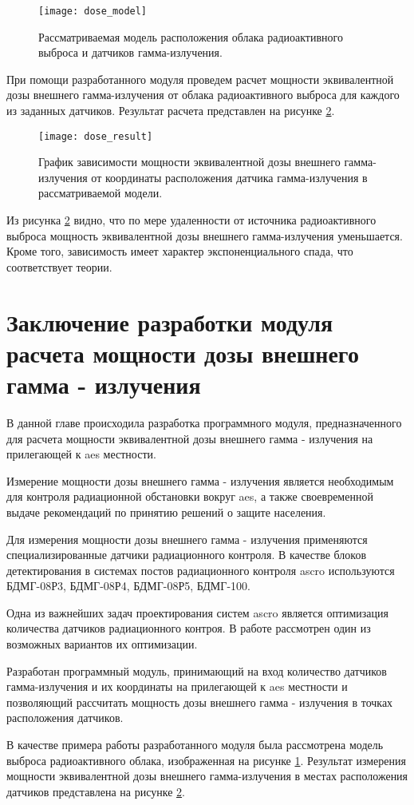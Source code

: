 \begin{figure}[ht]
    \centering
    \texttt{[image: dose\_model]}
    \captionsetup{justification=centering}
    \caption{Рассматриваемая модель расположения облака радиоактивного выброса и датчиков гамма-излучения.}
    \label{fig_dose_model}
\end{figure}

При помощи разработанного модуля проведем расчет мощности эквивалентной дозы внешнего гамма-излучения от облака 
радиоактивного выброса для каждого из заданных датчиков. Результат расчета представлен на рисунке \ref{fig_dose_result}.

\begin{figure}[ht]
    \centering
    \texttt{[image: dose\_result]}
    \captionsetup{justification=centering}
    \caption{График зависимости мощности эквивалентной дозы внешнего гамма-излучения от координаты расположения датчика 
        гамма-излучения в рассматриваемой модели.}
    \label{fig_dose_result}
\end{figure}

Из рисунка \ref{fig_dose_result} видно, что по мере удаленности от источника радиоактивного выброса мощность 
эквивалентной дозы внешнего гамма-излучения уменьшается. Кроме того, зависимость имеет характер экспоненциального спада, 
что соответствует теории.

\section{Заключение разработки модуля расчета мощности дозы внешнего гамма - излучения}

В данной главе происходила разработка программного модуля, предназначенного для расчета мощности эквивалентной дозы 
внешнего гамма - излучения на прилегающей к \ac{aes} местности. 

Измерение мощности дозы внешнего гамма - излучения является необходимым для контроля радиационной обстановки вокруг 
\ac{aes}, а также своевременной выдаче рекомендаций по принятию решений о защите населения.

Для измерения мощности дозы внешнего гамма - излучения применяются специализированные датчики радиационного контроля. 
В качестве блоков детектирования в системах постов радиационного контроля \ac{ascro} используются БДМГ-08Р3, 
БДМГ-08Р4, БДМГ-08Р5, БДМГ-100.

Одна из важнейших задач проектирования систем \ac{ascro} является оптимизация количества датчиков радиационного контроя. 
В работе рассмотрен один из возможных вариантов их оптимизации.

Разработан программный модуль, принимающий на вход количество датчиков гамма-излучения и их координаты на 
прилегающей к \ac{aes} местности и позволяющий рассчитать мощность дозы внешнего гамма - излучения в точках расположения 
датчиков. 

В качестве примера работы разработанного модуля была рассмотрена модель выброса радиоактивного облака, изображенная на 
рисунке \ref{fig_dose_model}. Результат измерения мощности эквивалентной дозы внешнего гамма-излучения в местах 
расположения датчиков представлена на рисунке \ref{fig_dose_result}.